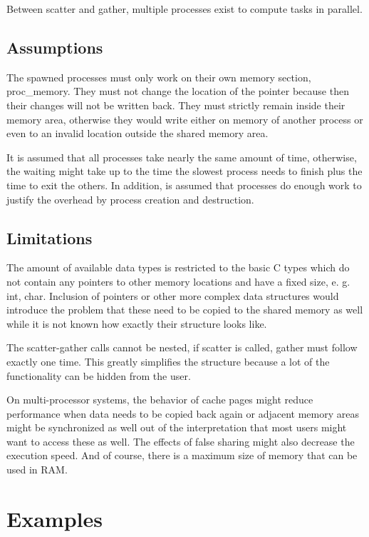 \documentclass[a4paper]{article}
\begin{document}
Between scatter and gather, multiple processes exist to compute tasks in parallel.

\subsection{Assumptions}

The spawned processes must only work on their own memory section, proc\_memory. They must not change the location of the pointer because then their changes will not be written back. They must strictly remain inside their memory area, otherwise they would write either on memory of another process or even to an invalid location outside the shared memory area.  

It is assumed that all processes take nearly the same amount of time, otherwise, the waiting might take up to the time the slowest process needs to finish plus the time to exit the others. In addition, is assumed that processes do enough work to justify the overhead by process creation and destruction.

\subsection{Limitations}

The amount of available data types is restricted to the basic C types which do not contain any pointers to other memory locations and have a fixed size, e. g. int, char. Inclusion of pointers or other more complex data structures would introduce the problem that these need to be copied to the shared memory as well while it is not known how exactly their structure looks like.

The scatter-gather calls cannot be nested, if scatter is called, gather must follow exactly one time. This greatly simplifies the structure because a lot of the functionality can be hidden from the user. 

On multi-processor systems, the behavior of cache pages might reduce performance when data needs to be copied back again or adjacent memory areas might be synchronized as well out of the interpretation that most users might want to access these as well. The effects of false sharing might also decrease the execution speed. And of course, there is a maximum size of memory that can be used in RAM.

\section{Examples}
\end{document}
